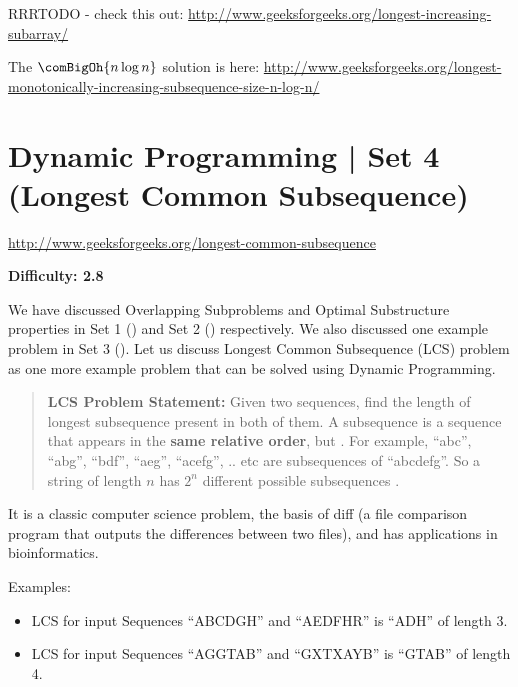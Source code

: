 \RayNotesBegin

RRRTODO - check this out:
\url{http://www.geeksforgeeks.org/longest-increasing-subarray/}

The $\comBigOh{n\log n}$ solution is here: \url{http://www.geeksforgeeks.org/longest-monotonically-increasing-subsequence-size-n-log-n/}

\RayNotesEnd


\section{Dynamic Programming | Set 4 (Longest Common Subsequence)
  \label{secGFGDPSet4LCS}}

\url{http://www.geeksforgeeks.org/longest-common-subsequence}

\textbf{Difficulty: 2.8}

We have discussed Overlapping Subproblems and Optimal Substructure
properties in Set 1 () and Set 2
() respectively. We also discussed
one example problem in Set 3 (). Let us discuss
Longest Common Subsequence (LCS) problem as one more example problem that
can be solved using Dynamic Programming.

\begin{quotation}
\textbf{LCS Problem Statement:} Given two sequences, find the length of
longest subsequence present in both of them. A subsequence is a sequence
that appears in the \textbf{same relative order}, but . For example, ``abc'', ``abg'', ``bdf'', ``aeg'', ``acefg'',
.. etc are subsequences of ``abcdefg''. So a string of length $n$ has $2^n$
different possible subsequences .
\end{quotation}

It is a classic computer science problem, the basis of diff (a file
comparison program that outputs the differences between two files), and has
applications in bioinformatics.

Examples:
\begin{itemize}%
\item LCS for input Sequences ``ABCDGH'' and ``AEDFHR'' is ``ADH'' of length
  3.
\item LCS for input Sequences ``AGGTAB'' and ``GXTXAYB'' is ``GTAB'' of
  length 4.
\end{itemize}

